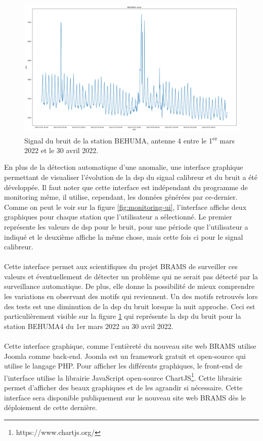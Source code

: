 \documentclass[11pt]{article}
\begin{document}
\begin{figure}[t]
    \begin{center}
        \includegraphics[scale=0.235]{BEHUMA4_2022-03-01_2022-04-30_noise.png}
        \caption{Signal du bruit de la station BEHUMA, antenne 4 entre le 1\textsuperscript{er} mars 2022 et le 30 avril 2022.}
        \label{fig:BEHUMA4-variations}
    \end{center}
\end{figure}

En plus de la détection automatique d'une anomalie, une interface graphique permettant de visualiser l'évolution de la dsp du signal calibreur et du bruit a été développée.
Il faut noter que cette interface est indépendant du programme de monitoring même, il utilise, cependant, les données générées par ce-dernier.
Comme on peut le voir sur la figure  \ref{fig:monitoring-ui}, l'interface affiche deux graphiques pour chaque station que l'utilisateur a sélectionné.
Le premier représente les valeurs de dsp pour le bruit, pour une période que l'utilisateur a indiqué et le deuxième affiche la même chose, mais cette fois ci pour le signal calibreur.\\
\\
Cette interface permet aux scientifiques du projet BRAMS de surveiller ces valeurs et éventuellement de détecter un problème qui ne serait pas détecté par la surveillance automatique.
De plus, elle donne la possibilité de mieux comprendre les variations en observant des motifs qui reviennent.
Un des motifs retrouvés lors des tests est une diminution de la dsp du bruit lorsque la nuit approche.
Ceci est particulièrement visible sur la figure \ref{fig:BEHUMA4-variations} qui représente la dsp du bruit pour la station BEHUMA4 du 1er mars 2022 au 30 avril 2022.\\
\\
Cette interface graphique, comme l'entièreté du nouveau site web BRAMS utilise Joomla comme back-end.
Joomla est un framework gratuit et open-source qui utilise le langage PHP.
Pour afficher les différents graphiques, le front-end de l'interface utilise la librairie JavaScript open-source ChartJS\footnote{https://www.chartjs.org/}.
Cette librairie permet d'afficher des beaux graphiques et de les agrandir si nécessaire.
Cette interface sera disponible publiquement sur le nouveau site web BRAMS dès le déploiement de cette dernière.
\end{document}
